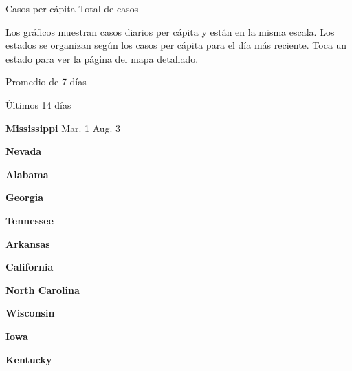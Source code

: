 Casos per cápita Total de casos

Los gráficos muestran casos diarios per cápita y están en la misma
escala. Los estados se organizan según los casos per cápita para el día
más reciente. Toca un estado para ver la página del mapa detallado.

\href{https://www.nytimes.com/interactive/2020/us/mississippi-coronavirus-cases.html}{}

Promedio de 7 días

Últimos 14 días

\textbf{Mississippi} Mar. 1 Aug. 3

\href{https://www.nytimes.com/interactive/2020/us/nevada-coronavirus-cases.html}{}

\textbf{Nevada}

\href{https://www.nytimes.com/interactive/2020/us/alabama-coronavirus-cases.html}{}

\textbf{Alabama}

\href{https://www.nytimes.com/interactive/2020/us/georgia-coronavirus-cases.html}{}

\textbf{Georgia}

\href{https://www.nytimes.com/interactive/2020/us/tennessee-coronavirus-cases.html}{}

\textbf{Tennessee}

\href{https://www.nytimes.com/interactive/2020/us/arkansas-coronavirus-cases.html}{}

\textbf{Arkansas}

\href{https://www.nytimes.com/interactive/2020/us/california-coronavirus-cases.html}{}

\textbf{California}

\href{https://www.nytimes.com/interactive/2020/us/north-carolina-coronavirus-cases.html}{}

\textbf{North Carolina}

\href{https://www.nytimes.com/interactive/2020/us/wisconsin-coronavirus-cases.html}{}

\textbf{Wisconsin}

\href{https://www.nytimes.com/interactive/2020/us/iowa-coronavirus-cases.html}{}

\textbf{Iowa}

\href{https://www.nytimes.com/interactive/2020/us/kentucky-coronavirus-cases.html}{}

\textbf{Kentucky}

\href{https://www.nytimes.com/interactive/2020/us/indiana-coronavirus-cases.html}{}

